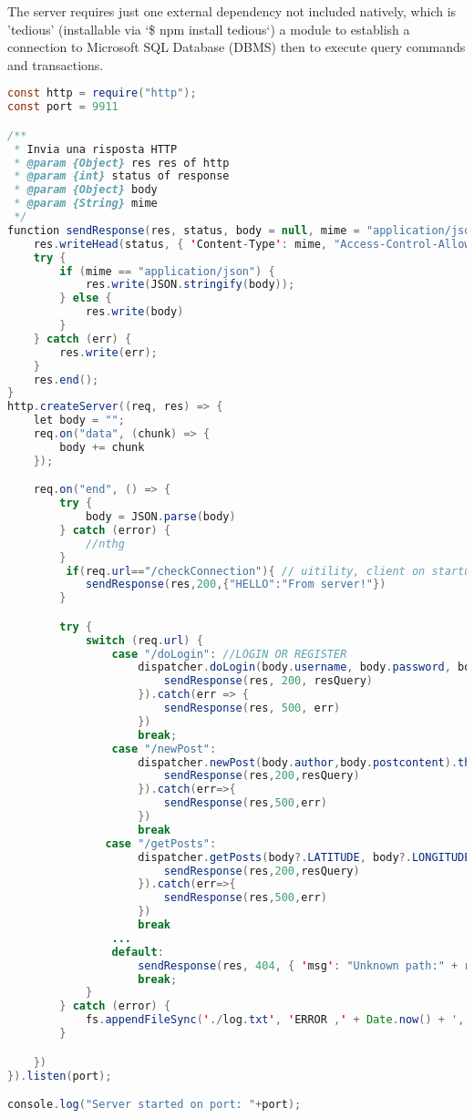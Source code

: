 \documentclass[conference]{IEEEtran}
\begin{document}
The server requires just one external dependency not included natively, which is 'tedious'\cite{b5} (installable via `\$ npm install tedious`) a module to establish a connection to Microsoft SQL Database (DBMS) then to execute query commands and transactions.

\begin{lstlisting}[language=Java, caption=Snippet of GeoMedia HTTP server]
const http = require("http");
const port = 9911

/**
 * Invia una risposta HTTP
 * @param {Object} res res of http 
 * @param {int} status of response 
 * @param {Object} body 
 * @param {String} mime 
 */
function sendResponse(res, status, body = null, mime = "application/json") {
    res.writeHead(status, { 'Content-Type': mime, "Access-Control-Allow-Origin": "*" });
    try {
        if (mime == "application/json") {
            res.write(JSON.stringify(body));
        } else {
            res.write(body)
        }
    } catch (err) {
        res.write(err);
    }
    res.end();
}
http.createServer((req, res) => {
    let body = "";
    req.on("data", (chunk) => {
        body += chunk
    });

    req.on("end", () => {
        try {
            body = JSON.parse(body)
        } catch (error) {
            //nthg
        }
         if(req.url=="/checkConnection"){ // uitility, client on startup send this request, to make sure its configuratin is correct. If server responds the configuration is right
            sendResponse(res,200,{"HELLO":"From server!"})
        }

        try {
            switch (req.url) {
                case "/doLogin": //LOGIN OR REGISTER
                    dispatcher.doLogin(body.username, body.password, body.newuser).then(resQuery => {
                        sendResponse(res, 200, resQuery)
                    }).catch(err => {
                        sendResponse(res, 500, err)
                    })
                    break;
                case "/newPost":
                    dispatcher.newPost(body.author,body.postcontent).then(resQuery=>{
                        sendResponse(res,200,resQuery)
                    }).catch(err=>{
                        sendResponse(res,500,err)
                    })
                    break
               case "/getPosts":
                    dispatcher.getPosts(body?.LATITUDE, body?.LONGITUDE,body?.USERNAME).then(resQuery=>{
                        sendResponse(res,200,resQuery)
                    }).catch(err=>{
                        sendResponse(res,500,err)
                    })
                    break
                ...
                default:
                    sendResponse(res, 404, { 'msg': "Unknown path:" + req.url })
                    break;
            }
        } catch (error) {
            fs.appendFileSync('./log.txt', 'ERROR ,' + Date.now() + ',' + error)
        }

    })
}).listen(port);

console.log("Server started on port: "+port);

\end{lstlisting}
\end{document}
